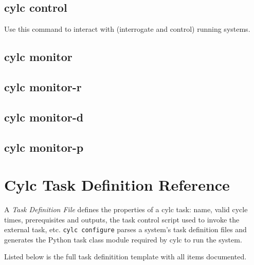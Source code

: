 \documentclass[11pt,a4paper]{article}
\begin{document}
\pagebreak
\subsection{cylc control}

Use this command to interact with (interrogate and control) running systems.

{

}

\pagebreak
\subsection{cylc monitor}
{

}

\subsection{cylc monitor-r}
{

}

\subsection{cylc monitor-d}
{

}

\subsection{cylc monitor-p}
{

}

\pagebreak
\section{Cylc Task Definition Reference}

A {\em Task Definition File} defines the properties of a cylc task:
name, valid cycle times, prerequisites and outputs, the task
control script used to invoke the external task, etc.  
\lstinline=cylc configure= parses a system's task definition files and
generates the Python task class module required by cylc to run the
system.

Listed below is the full task definitition template with all items documented.

\lstset{language=cylctaskdef}

{

}

\lstset{language=}

\end{document}
